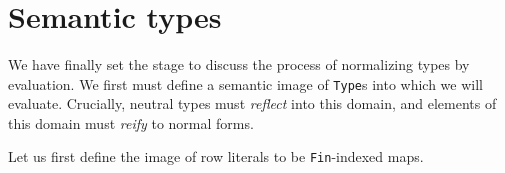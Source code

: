 \documentclass[authoryear, acmsmall, screen, review, nonacm]{acmart}
\begin{document}
\begin{code}[hide]
\AgdaSpace{}%
\AgdaSymbol{)}\AgdaSpace{}%
\AgdaSymbol{=}\AgdaSpace{}%
\AgdaSymbol{(}\AgdaSpace{}%
\AgdaSymbol{)}\AgdaSpace{}%
\AgdaSpace{}%
\AgdaSymbol{(}\AgdaSpace{}%
\AgdaSymbol{)}\<%
\\
%
\\[\AgdaEmptyExtraSkip]%
\>[0]\AgdaSpace{}%
\AgdaSymbol{(}\AgdaSpace{}%
\AgdaSpace{}%
\AgdaSpace{}%
\AgdaOperator{\AgdaInductiveConstructor{\textasciitilde{}}}\AgdaSpace{}%
\AgdaSymbol{)}\AgdaSpace{}%
\AgdaSymbol{=}\AgdaSpace{}%
\AgdaSymbol{(}\AgdaSpace{}%
\AgdaSymbol{)}\AgdaSpace{}%
\AgdaSpace{}%
\AgdaSymbol{(}\AgdaSpace{}%
\AgdaSymbol{)}\AgdaSpace{}%
\AgdaOperator{\AgdaInductiveConstructor{\textasciitilde{}}}\AgdaSpace{}%
\AgdaSymbol{(}\AgdaSpace{}%
\AgdaSymbol{)}\<%
\\
\>[0]\AgdaSpace{}%
\AgdaSymbol{(}\AgdaSpace{}%
\AgdaSpace{}%
\AgdaSymbol{)}\AgdaSpace{}%
\AgdaSymbol{=}\AgdaSpace{}%
\AgdaSymbol{(}\AgdaSpace{}%
\AgdaSymbol{)}\AgdaSpace{}%
\AgdaSpace{}%
\AgdaSymbol{(}\AgdaSpace{}%
\AgdaSymbol{)}\<%
\end{code}


\section{Semantic types}

We have finally set the stage to discuss the process of normalizing types by evaluation. We first must define a semantic image of \verb!Type!s into which we will evaluate. Crucially, neutral types must \emph{reflect} into this domain, and elements of this domain must \emph{reify} to normal forms.

Let us first define the image of row literals to be \verb!Fin!-indexed maps.

\begin{code}%
\>[0]\AgdaSpace{}%
\AgdaSymbol{:}\AgdaSpace{}%
\AgdaSpace{}%
\AgdaSpace{}%
\<%
\\
\>[0]\AgdaSpace{}%
\AgdaSpace{}%
\AgdaSymbol{=}\AgdaSpace{}%
\AgdaFunction{∃[}\AgdaSpace{}%
\AgdaSpace{}%
\AgdaFunction{]}\AgdaSymbol{(}\AgdaSpace{}%
\AgdaSpace{}%
\AgdaSpace{}%
\AgdaSpace{}%
\AgdaSpace{}%
\AgdaSymbol{)}\<%
\end{code}
\end{document}
